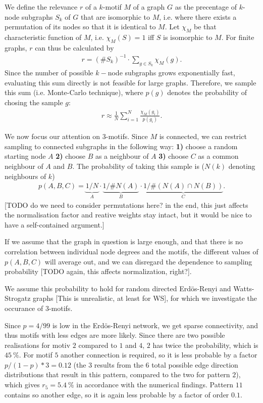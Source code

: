 \documentclass{scrartcl}
\begin{document}
We define the relevance $r$ of a $k$-motif $M$ of a graph $G$ as the
precentage of $k$-node subgraphs $S_k$ of $G$ that are isomorphic to $M$,
i.e. where there exists a permutation of its nodes so that it is identical
to $M$. Let $\chi_M$ be that characteristic function of $M$, i.e.
$\chi_M(S) = 1$ iff $S$ is isomorphic to $M$. 
For finite graphs, $r$ can thus be calculated by 
\begin{align}
 r = (\# S_k)^{-1} \cdot \sum_{g \in S_k} \chi_M (g).
\end{align}
Since the number of possible $k-$node subgraphs grows exponentially fast,
evaluating this sum directly is not feasible for large graphs. Therefore,
we sample this sum (i.e. Monte-Carlo technique), where $p(g)$ denotes the
probability of chosing the sample $g$:
\begin{align}
 r \approx \frac{1}{N} \sum_{i=1}^{N} \frac{\chi_M (g_i)}{p(g_i)}.
\end{align}

We now focus our attention on $3$-motifs. Since $M$ is connected, we can
restrict sampling to connected subgraphs in the following way: \textbf{1)}
choose a random starting node $A$ \textbf{2)} choose $B$ as a neighbour of
$A$ \textbf{3)} choose $C$ as a common neighbour of $A$ and $B$. The
probability of taking this sample is ($N(k)$ denoting neighbours of $k$)
\begin{align}
 p(A,B,C) = \underbrace{1/N}_{A} \cdot \underbrace{1/\#N(A)}_{B} \cdot \underbrace{1/\#(N(A) \cap N(B))}_{C}.
\end{align}
[TODO do we need to consider permutations here? in the end, this just
affects the normalisation factor and reative weights stay intact, but it
would be nice to have a self-contained argument.]

If we assume that the graph in question is large enough, and that there is
no correlation between individual node degrees and the motifs, the
different values of $p(A,B,C)$ will average out, and we can disregard the
dependence to sampling probability [TODO again, this affects normalization,
right?]. 

We assume this probability to hold for random directed Erdös-Renyi and
Watts-Strogatz graphs [This is unrealistic, at least for WS], for which we
investigate the occurance of 3-motifs.

Since $p=4/99$ is low in the Erdös-Renyi network, we get sparse
connectivity, and thus motifs with less edges are more likely. Since there
are two possible realisations for motiv $2$ compared to $1$ and $4$, $2$
has twice the probability, which is $\SI{45}{\percent}$. For motif $5$
another connection is required, so it is less probable by a factor
$p/(1-p)*3 = 0.12$ (the $3$ results from the $6$ total possible edge
direction distributions that result in this pattern, compared to the two
for pattern $2$), which gives $r_5=\SI{5.4}{\percent}$ in accordance with
the numerical findings. Pattern $11$ contains so another edge, so it is
again less probable by a factor of order $0.1$.
\end{document}
